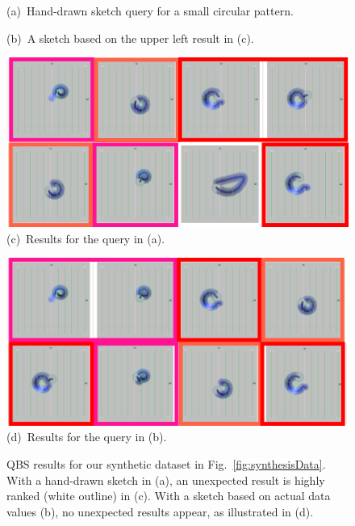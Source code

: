 \begin{figure}[tb]
\begin{minipage}{0.49\linewidth}
    \end{minipage}
    \begin{minipage}{0.49\linewidth}
        \centering
        \footnotesize{\sf (a)~Hand-drawn sketch query for a small circular pattern.}
    \end{minipage}
    \begin{minipage}{0.49\linewidth}
        \centering
        \footnotesize{\sf (b)~A sketch based on the upper left result in (c). 
        }
    \end{minipage}
    \begin{minipage}{0.49\linewidth}
        \centering
        \includegraphics[width=.99\linewidth]{vgtc_journal_latex/figures/QBSResultsHanddrawn_revised.png}\\
        \footnotesize{\sf (c)~Results for the query in (a).}
    \end{minipage}
    \begin{minipage}{0.49\linewidth}
        \centering
        \includegraphics[width=.99\linewidth]{vgtc_journal_latex/figures/QBSResultsResultQuery_revised.png}\\
        \footnotesize{\sf (d)~Results for the query in (b).}
    \end{minipage}
    \caption{QBS results for our synthetic dataset in Fig.~\ref{fig:synthesisData}.
        With a hand-drawn sketch in (a), an unexpected result is highly ranked (white outline) in (c). 
        With a sketch based on actual data values (b), no unexpected results appear, as illustrated in (d).
        }
    \label{fig:QBSDemodata}
\end{figure}
